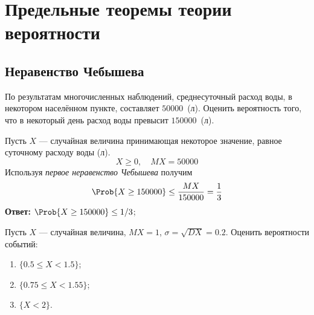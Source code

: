 
\section{Предельные теоремы теории вероятности}


\subsection{Неравенство Чебышева}

\begin{thm}
	
\end{thm}

\begin{thm}
	
\end{thm}

\begin{exm}
	По результатам многочисленных наблюдений, среднесуточный расход воды, в некотором населённом пункте, составляет $50000$~(л). Оценить вероятность того, что в некоторый день расход воды превысит $150000$~(л).
\end{exm}

\begin{slv}
	Пусть $X$ --- случайная величина принимающая некоторое значение, равное суточному расходу воды (л).
	\[
		X \geq 0, \quad MX = 50000
	\]
	Используя \textit{первое неравенство Чебышева} получим
	\[
		\Prob\{X \geq 150000\} \leq \frac{MX}{150000} = \frac{1}{3}
	\]
	\textbf{Ответ:} $\Prob\{X \geq 150000\} \leq 1/3$;
\end{slv}


\begin{exm}
	Пусть $X$ --- случайная величина, $MX = 1$, $\sigma = \sqrt{DX} = 0.2$. Оценить вероятности событий:
	\begin{enumerate}
		\item $\{ 0.5 \leq X < 1.5 \}$;
		\item $\{ 0.75 \leq X < 1.55 \}$;
		\item $\{ X < 2 \}$.	
	\end{enumerate}
\end{exm}

